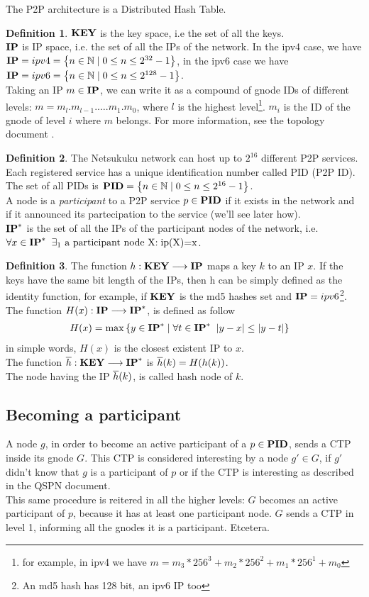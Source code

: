 \documentclass[a4paper]{article}
\newcommand{\T}[1]{\textrm{#1}}
\newcommand{\pgra}[1]{\left\{#1\right\}}
\newcommand{\eal}[1]{{\begin{align*} #1 \end{align*}}}
\theoremstyle{definition}
\newtheorem{defn}{Definition}[section]
\begin{document}
The P2P architecture is a Distributed Hash Table.
\begin{defn}
$\textbf{KEY}$ is the key space, i.e the set of all the keys. \\
$\textbf{IP}$ is IP space, i.e. the set of all the IPs of the network. In the ipv4 case, we have 
$\ip=ipv4=\pgra{n\in\mathbb{N}\;|\;0\le n\le 2^{32}-1}$, in the ipv6 case we have
$\ip=ipv6=\pgra{n\in\mathbb{N}\;|\;0\le n\le 2^{128}-1}$.\\
Taking an IP $m\in \textbf{IP}$, we can write it as a compound of gnode IDs of
different levels: $m=m_l.m_{l-1}. \dots . m_1.m_0$, where $l$ is the highest
level\footnote{for example, in ipv4 we have
$m=m_3*256^3+m_2*256^2+m_1*256^1+m_0$}. $m_i$ is the ID of the gnode of level $i$ where $m$ belongs. For more
information, see the topology document \cite{topodoc}.
\end{defn}
\begin{defn}
The Netsukuku network can host up to $2^{16}$ different P2P services. Each
registered service has a unique identification number called PID (P2P ID). The
set of all PIDs is $\PID=\pgra{n\in \mathbb{N}\;|\;0\le n\le 2^{16}-1}$.\\
A node is a \emph{participant} to a P2P service $p\in \textbf{PID}$ if it exists in the
network and if it announced its partecipation to the service (we'll see later
how).\\
$\textbf{IP}^*$ is the set of all the IPs of the participant nodes of the network, i.e. 
$\forall x\in \ipe\;\;\exists_1 \T{ a participant node X:\;ip(X)=x}$.
\end{defn}
\begin{defn}
The function $h:\textbf{KEY}\longrightarrow \textbf{IP}$ maps a key $k$ to an IP $x$.
If the keys have the same bit length of the IPs, then h can be
simply defined as the identity function, for example, if $\textbf{KEY}$ is the md5
hashes set and $\textbf{IP}=ipv6$\footnote{An md5 hash has 128 bit, an ipv6 IP too}.\\
The function $H(x):\textbf{IP}\longrightarrow \textbf{IP}^*$, is defined as follow
\eal{&H(x)=\max \pgra{y \in \ipe\;|\; \forall t\in \ipe\;\;|y-x| \le |y-t| } }
in simple words, $H(x)$ is the closest existent IP to $x$. 
\\
The function ${{\overline{h}}}:\textbf{KEY} \longrightarrow \textbf{IP}^*$ is ${{\overline{h}}}(k)=H(h(k))$.\\
The node having the IP ${{\overline{h}}}(k)$, is called hash node of $k$.
\end{defn}

\subsection{Becoming a participant}
A node $g$, in order to become an active participant of a $p\in \textbf{PID}$, sends a
CTP inside its gnode $G$. This CTP is considered interesting by a node $g'\in
G$, if $g'$ didn't know that $g$ is a participant of $p$ or if the CTP is
interesting as described in the QSPN document\cite{qspndoc}.\\
This same procedure is reitered in all the higher levels: $G$ becomes an
active participant of $p$, because it has at least one participant node. $G$
sends a CTP in level 1, informing all the gnodes it is a participant.
Etcetera.\\
\end{document}

